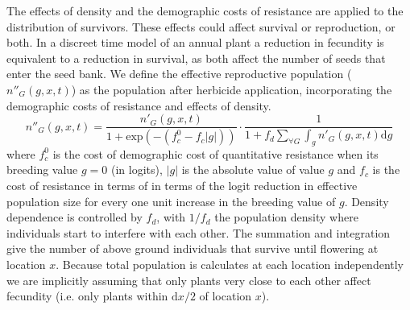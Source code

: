 \documentclass[12pt,a4paper]{article}
\begin{document}
The effects of density and the demographic costs of resistance are applied to the distribution of survivors. These effects could affect survival or reproduction, or both. In a discreet time model of an annual plant a reduction in fecundity is equivalent to a reduction in survival, as both affect the number of seeds that enter the seed bank. We define the effective reproductive population ($n''_G(g, x, t)$) as the population after herbicide application, incorporating the demographic costs of resistance and effects of density. 
\begin{equation}\label{eq:effect_pop}
	n''_G(g, x, t) = \frac{n'_G(g, x, t)}{1 + \text{exp}(-(f_c^0 - f_c|g|))}\cdot\frac{1}{1 + f_d\sum_{\forall G} \int_g n'_G(g, x, t)\text{d}g}
\end{equation} 
where $f_c^0$ is the cost of demographic cost of quantitative resistance when its breeding value $g = 0$ (in logits), $|g|$ is the absolute value of value $g$ and $f_c$ is the cost of resistance in terms of in terms of the logit reduction in effective population size for every one unit increase in the breeding value of $g$. Density dependence is controlled by $f_d$, with $1/f_d$ the population density where individuals start to interfere with each other. The summation and integration give the number of above ground individuals that survive until flowering at location $x$. Because total population is calculates at each location independently we are implicitly assuming that only plants very close to each other affect fecundity (i.e. only plants within $\text{d}x / 2$ of location $x$). 
\end{document}
